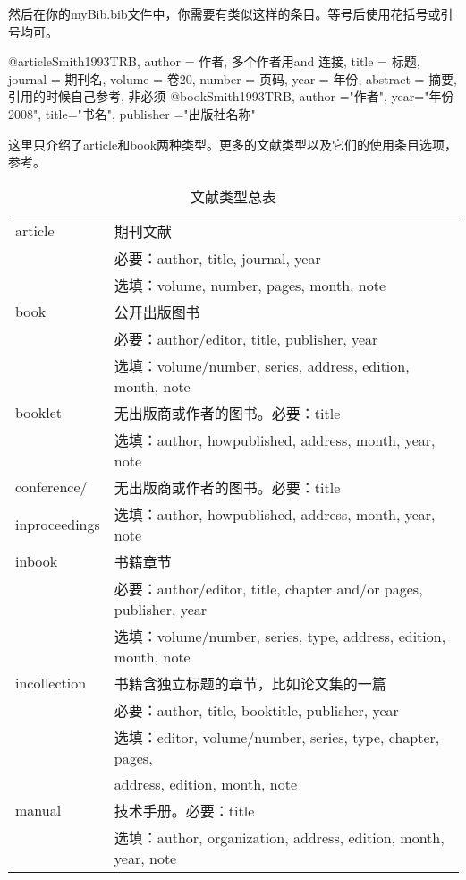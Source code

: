 然后在你的myBib.bib文件中，你需要有类似这样的条目。等号后使用花括号或引号均可。
\begin{latex}
@article{Smith1993TRB,
    author = {作者, 多个作者用and 连接},
    title = {标题},
    journal = {期刊名},
    volume = {卷20},
    number = {页码},
    year = {年份},
    abstract = {摘要, 引用的时候自己参考, 非必须}}
@book{Smith1993TRB,
    author ="作者",
    year="年份2008",
    title="书名",
    publisher ="出版社名称"}
\end{latex}

这里只介绍了article和book两种类型。更多的文献类型以及它们的使用条目选项，参考。

\begin{table}[!htb]
\centering
\caption{\bibtex 文献类型总表}
\label{tab:bibtype}
\begin{tabular}{>{\ttfamily}ll}
\hline
article & 期刊文献 \\
& 必要：author, title, journal, year \\
& 选填：volume, number, pages, month, note \\
\hline
book & 公开出版图书 \\
& 必要：author/editor, title, publisher, year \\
& 选填：volume/number, series, address, edition, month, note \\
\hline
booklet & 无出版商或作者的图书。必要：title\\
& 选填：author, howpublished, address, month, year, note \\
\hline
conference/ & 无出版商或作者的图书。必要：title \\
inproceedings & 选填：author, howpublished, address, month, year, note \\
\hline
inbook & 书籍章节 \\
& 必要：author/editor, title, chapter and/or pages, publisher, year\\
& 选填：volume/number, series, type, address, edition, month, note\\
\hline
incollection & 书籍含独立标题的章节，比如论文集的一篇 \\
& 必要：author, title, booktitle, publisher, year \\
& 选填：editor, volume/number, series, type, chapter, pages, \\
& address, edition, month, note \\
\hline
manual & 技术手册。必要：title \\
& 选填：author, organization, address, edition, month, year, note \\

\end{tabular}
\end{table}
